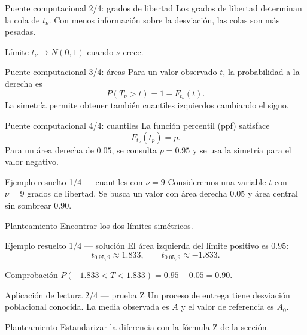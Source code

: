 \documentclass[10pt,aspectratio=169]{beamer}
\begin{document}
\begin{frame}{Puente computacional 2/4: grados de libertad}
  \footnotesize
  Los grados de libertad determinan la cola de $t_\nu$. Con menos información
  sobre la desviación, las colas son más pesadas.
  \begin{block}{Límite}
    $t_\nu\to N(0,1)$ cuando $\nu$ crece.
  \end{block}
\end{frame}

\begin{frame}{Puente computacional 3/4: áreas}
  \footnotesize
  Para un valor observado $t$, la probabilidad a la derecha es
  \[
    P(T_\nu>t)=1-F_{t_\nu}(t).
  \]
  La simetría permite obtener también cuantiles izquierdos cambiando el signo.
\end{frame}

\begin{frame}{Puente computacional 4/4: cuantiles}
  \footnotesize
  La función percentil (ppf) satisface
  \[
    F_{t_\nu}(t_p)=p.
  \]
  Para un área derecha de $0.05$, se consulta $p=0.95$ y se usa la simetría
  para el valor negativo.
\end{frame}

\begin{frame}{Ejemplo resuelto 1/4 --- cuantiles con $\nu=9$}
  \footnotesize
  Consideremos una variable $t$ con $\nu=9$ grados de libertad. Se busca un
  valor con área derecha $0.05$ y área central sin sombrear $0.90$.
  \begin{block}{Planteamiento}
    Encontrar los dos límites simétricos.
  \end{block}
\end{frame}

\begin{frame}{Ejemplo resuelto 1/4 --- solución}
  \footnotesize
  El área izquierda del límite positivo es $0.95$:
  \[
    t_{0.95,9}\approx1.833,
    \qquad t_{0.05,9}\approx-1.833.
  \]
  \begin{alertblock}{Comprobación}
    $P(-1.833<T<1.833)=0.95-0.05=0.90$.
  \end{alertblock}
\end{frame}

\begin{frame}{Aplicación de lectura 2/4 --- prueba Z}
  \footnotesize
  Un proceso de entrega tiene desviación poblacional conocida. La media
  observada es $A$ y el valor de referencia es $A_0$.
  \begin{block}{Planteamiento}
    Estandarizar la diferencia con la fórmula Z de la sección.
  \end{block}
\end{frame}
\end{document}

